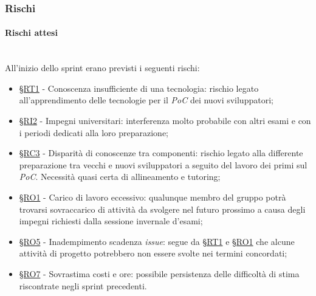 \documentclass[10pt, letterpaper]{article}
\newcommand{\trisubsection}[1]{\paragraph{#1}\mbox{}\\}
\newcommand{\rif}[1]{\hyperref[#1]{§#1}}
\begin{document}
\subsubsection{Rischi}
\trisubsection{Rischi attesi}
All'inizio dello sprint erano previsti i seguenti rischi:
\begin{itemize}
    \item \rif{RT1} - Conoscenza insufficiente di una tecnologia: rischio legato all'apprendimento delle tecnologie per il \textit{PoC} dei nuovi sviluppatori;
    \item \rif{RI2} - Impegni universitari: interferenza molto probabile con altri esami e con i periodi dedicati alla loro preparazione;
    \item \rif{RC3} - Disparità di conoscenze tra componenti: rischio legato alla differente preparazione tra vecchi e nuovi sviluppatori a seguito del lavoro dei primi sul \textit{PoC}. Necessità quasi certa di allineamento e tutoring;
    \item \rif{RO1} - Carico di lavoro eccessivo: qualunque membro del gruppo potrà trovarsi sovraccarico di attività da svolgere nel futuro prossimo a causa degli impegni richiesti dalla sessione invernale d'esami;
    \item \rif{RO5} - Inadempimento scadenza \textit{issue}: segue da \rif{RT1} e \rif{RO1} che alcune attività di progetto potrebbero non essere svolte nei termini concordati;
    \item \rif{RO7} - Sovrastima costi e ore: possibile persistenza delle difficoltà di stima riscontrate negli sprint precedenti.
\end{itemize}
\end{document}
